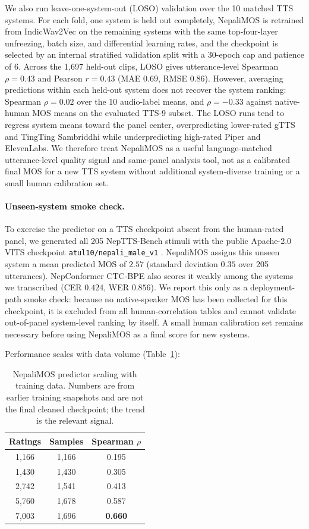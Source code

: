 \documentclass[11pt]{article}
\begin{document}
We also run leave-one-system-out (LOSO) validation over the 10 matched TTS systems. For each fold, one system is held out completely, NepaliMOS is retrained from IndicWav2Vec on the remaining systems with the same top-four-layer unfreezing, batch size, and differential learning rates, and the checkpoint is selected by an internal stratified validation split with a 30-epoch cap and patience of 6. Across the 1{,}697 held-out clips, LOSO gives utterance-level Spearman $\rho = 0.43$ and Pearson $r = 0.43$ (MAE $0.69$, RMSE $0.86$). However, averaging predictions within each held-out system does not recover the system ranking: Spearman $\rho = 0.02$ over the 10 audio-label means, and $\rho = -0.33$ against native-human MOS means on the evaluated TTS-9 subset. The LOSO runs tend to regress system means toward the panel center, overpredicting lower-rated gTTS and TingTing Sambriddhi while underpredicting high-rated Piper and ElevenLabs. We therefore treat NepaliMOS as a useful language-matched utterance-level quality signal and same-panel analysis tool, not as a calibrated final MOS for a new TTS system without additional system-diverse training or a small human calibration set.

\paragraph{Unseen-system smoke check.} To exercise the predictor on a TTS checkpoint absent from the human-rated panel, we generated all 205 NepTTS-Bench stimuli with the public Apache-2.0 VITS checkpoint \texttt{atul10/nepali\_male\_v1} \citep{atul102024nepalivits}. NepaliMOS assigns this unseen system a mean predicted MOS of $2.57$ (standard deviation $0.35$ over 205 utterances). NepConformer CTC-BPE also scores it weakly among the systems we transcribed (CER $0.424$, WER $0.856$). We report this only as a deployment-path smoke check: because no native-speaker MOS has been collected for this checkpoint, it is excluded from all human-correlation tables and cannot validate out-of-panel system-level ranking by itself. A small human calibration set remains necessary before using NepaliMOS as a final score for new systems.

Performance scales with data volume (Table~\ref{tab:scaling}):

\begin{table}[h]
\centering
\caption{NepaliMOS predictor scaling with training data. Numbers are from earlier training snapshots and are not the final cleaned checkpoint; the trend is the relevant signal.}
\label{tab:scaling}
\begin{tabular}{ccc}
\toprule
Ratings & Samples & Spearman $\rho$ \\
\midrule
1,166 & 1,166 & 0.195 \\
1,430 & 1,430 & 0.305 \\
2,742 & 1,541 & 0.413 \\
5,760 & 1,678 & 0.587 \\
7,003 & 1,696 & \textbf{0.660} \\
\bottomrule
\end{tabular}
\end{table}
\end{document}
